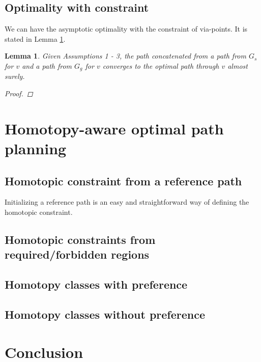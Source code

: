 \documentclass[letterpaper, 10 pt, conference]{ieeeconf}
\newtheorem{lem}{Lemma}
\begin{document}
\subsection{Optimality with constraint}

We can have the asymptotic optimality with the constraint of via-points.
It is stated in Lemma \ref{lem:optimal_via_point}.

\begin{lem}
\label{lem:optimal_via_point}
Given Assumptions 1 - 3,
the path concatenated from a path from $ G_{s} $ for $ v $ and a path from $ G_{g} $ for $ v $ converges to the optimal path through $ v $ almost surely. 
\begin{proof}
\end{proof}
\end{lem}




\section{Homotopy-aware optimal path planning}
\label{sec:application}

\subsection{Homotopic constraint from a reference path}

Initializing a reference path is an easy and straightforward way of defining the homotopic constraint.



\subsection{Homotopic constraints from required/forbidden regions}



\subsection{Homotopy classes with preference}

\subsection{Homotopy classes without preference}




\section{Conclusion}
\label{sec:conclusion}



\end{document}
